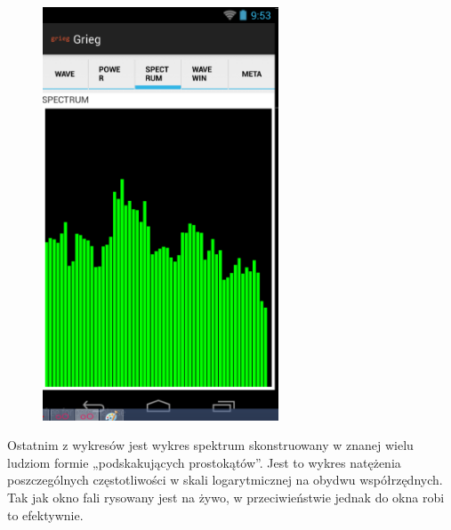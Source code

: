 \begin{figure}[H]
  \centering
  \includegraphics[width=7cm]{images/full_spectrum}
\end{figure}

Ostatnim z wykresów jest wykres spektrum skonstruowany w znanej wielu ludziom formie „podskakujących
prostokątów”. Jest to wykres natężenia poszczególnych częstotliwości w skali logarytmicznej na
obydwu współrzędnych. Tak jak okno fali rysowany jest na żywo, w przeciwieństwie jednak do okna robi
to efektywnie.

